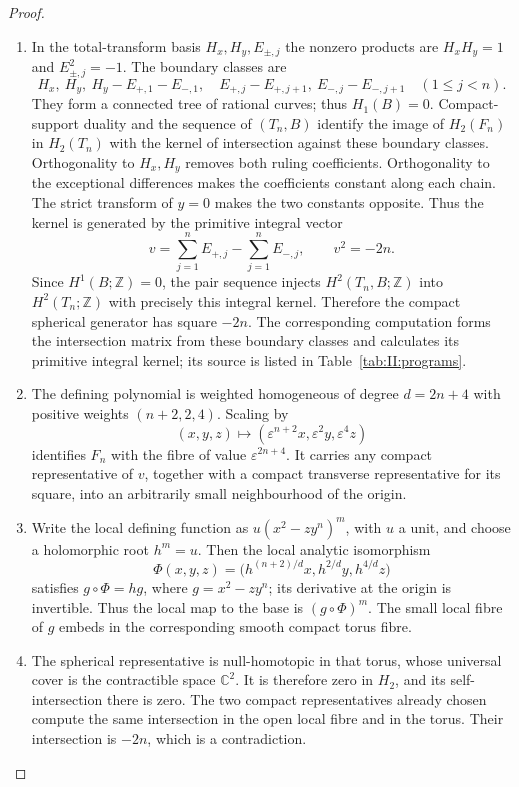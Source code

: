 \begin{proof}
\begin{enumerate}[label={$\langle1\rangle$\arabic*.},leftmargin=*]
\item In the total-transform basis $H_x,H_y,E_{\pm,j}$ the nonzero
products are $H_xH_y=1$ and $E_{\pm,j}^2=-1$. The boundary
classes are
\[
 H_x,\ H_y,\ H_y-E_{+,1}-E_{-,1},\quad
 E_{+,j}-E_{+,j+1},\ E_{-,j}-E_{-,j+1}\quad(1\leq j<n).
\]
They form a connected tree of rational curves; thus $H_1(B)=0$.
Compact-support duality \cite[Theorem~3.35, p.~245]{Hatcher2002}
and the sequence of $(T_n,B)$ identify
the image of $H_2(F_n)$ in $H_2(T_n)$ with the kernel of
intersection against these boundary classes. Orthogonality to
$H_x,H_y$ removes both ruling coefficients. Orthogonality to
the exceptional differences makes the coefficients constant
along each chain. The strict transform of $y=0$ makes the two
constants opposite. Thus the kernel is generated by the
primitive integral vector
\[
 v=\sum_{j=1}^n E_{+,j}-\sum_{j=1}^n E_{-,j},\qquad v^2=-2n.
\]
Since $H^1(B;\mathbb Z)=0$, the pair sequence injects
$H^2(T_n,B;\mathbb Z)$ into $H^2(T_n;\mathbb Z)$ with
precisely this integral kernel.
Therefore the compact spherical generator has square $-2n$.
The corresponding computation forms the intersection matrix from
these boundary classes and calculates its primitive integral kernel;
its source is listed in Table~\ref{tab:II:programs}.

\item The defining polynomial is weighted homogeneous of degree
$d=2n+4$ with positive weights $(n+2,2,4)$. Scaling by
\[
 (x,y,z)\longmapsto
 (\varepsilon^{n+2}x,\varepsilon^2y,\varepsilon^4z)
\]
identifies $F_n$ with the fibre of value $\varepsilon^{2n+4}$.
It carries any compact representative of $v$, together with a
compact transverse representative for its square, into an
arbitrarily small neighbourhood of the origin.

\item Write the local defining function as $u(x^2-zy^n)^m$, with $u$
a unit, and choose a holomorphic root $h^m=u$. Then
the local analytic isomorphism
\[
 \Phi(x,y,z)=
 \bigl(h^{(n+2)/d}x,h^{2/d}y,h^{4/d}z\bigr)
\]
satisfies $g\circ\Phi=hg$, where $g=x^2-zy^n$; its derivative
at the origin is invertible. Thus the local map to the
base is $(g\circ\Phi)^m$. The small local fibre of $g$ embeds
in the corresponding smooth compact torus fibre.

\item The spherical representative is null-homotopic in that torus,
whose universal cover is the contractible space $\mathbb C^2$.
It is therefore zero in $H_2$, and its self-intersection there
is zero. The two compact representatives already chosen compute
the same intersection in the open local fibre and in the torus.
Their intersection is $-2n$, which is a contradiction.

\end{enumerate}
\end{proof}
